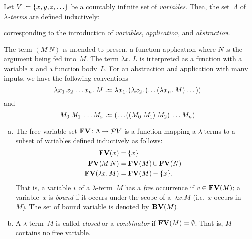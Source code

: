 \begin{definition}[Syntax]
  Let $V \defeq \{ x, y, z, \ldots \}$ be a countably infinite set of
  \emph{variables}.  Then, the set~$\Lambda$ of \emph{$\lambda$-terms} are
  defined inductively:
  \begin{multicols}{3}
    \begin{prooftree}
    \end{prooftree}
    \columnbreak
    \begin{prooftree}
    \end{prooftree}
    \columnbreak
    \begin{prooftree}
    \end{prooftree}
  \end{multicols}
  \noindent corresponding to the introduction of \emph{variables},
  \emph{application}, and \emph{abstraction}.
\end{definition}
The term $(M\;N)$ is intended to present a function application where $N$ is the
argument being fed into~$M$. The term $\lambda x.\; L$ is interpreted as a function
with a variable $x$ and a function body~$L$. For an abstraction and application
with many inputs, we have the following conventions
\[
  \lambda x_1\,x_2\,\dots x_n.\; M
  \defeq \lambda x_1.\,(\lambda x_2.\, (\dots (\lambda x_n.\; M)\dots))
\]
and
\[
  M_0\;M_1\;\dots M_n \defeq (\dots ((M_0\;M_1)\;M_2)\;\dots M_n)
\]
\begin{definition}
  \begin{enumerate}[(a)]
    \item The free variable set $\FV\colon \Lambda \to \mathcal{P}V$ is a
      function mapping a $\lambda$-terms to a subset of variables defined
      inductively as follows:
      \begin{align*}
        \FV(x) & = \{ x \} \\
        \FV(M\, N) & = \FV(M) \cup \FV(N) \\
        \FV(\lambda x.\, M) & = \FV(M) - \{ x \}.
      \end{align*}
      That is, a variable $v$ of a $\lambda$-term~$M$ has a \emph{free}
      occurrence if $v \in \FV(M)$; a variable~$x$ is \emph{bound} if it occurs
      under the scope of a~$\lambda x. M$ (i.e.\ $x$ occurs in~$M$). The set of bound variable is denoted by~$\BV(M)$.
    \item A $\lambda$-term~$M$ is called \emph{closed} or a \emph{combinator} if
      $\FV(M) = \emptyset$. That
      is, $M$ contains no free variable.
  \end{enumerate}
\end{definition}

